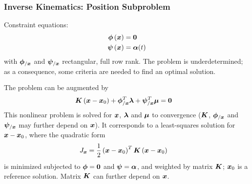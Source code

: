 \subsubsection{Inverse Kinematics: Position Subproblem}
Constraint equations:
\begin{subequations}
\begin{align}
	\bm{\phi}\left( \bm{x} \right)
	&=
	\bm{0}
	\\
	\bm{\psi}\left( \bm{x} \right)
	&=
	\bm{\alpha}(t)
\end{align}
\end{subequations}
with $\bm{\phi}_{/\bm{x}}$ and $\bm{\psi}_{/\bm{x}}$ rectangular, full row rank.
The problem is underdetermined;
as a consequence, some criteria are needed to find an optimal solution.

The problem can be augmented by
\begin{align}
	\bm{K} \left( \bm{x} - \bm{x}_0 \right)
	+
	\bm{\phi}_{/\bm{x}}^T \bm{\lambda}
	+
	\bm{\psi}_{/\bm{x}}^T \bm{\mu}
	&=
	\bm{0}
\end{align}
This nonlinear problem is solved for $\bm{x}$, $\bm{\lambda}$ and $\bm{\mu}$
to convergence ($\bm{K}$, $\bm{\phi}_{/\bm{x}}$ and $\bm{\psi}_{/\bm{x}}$
may further depend on $\bm{x}$).
It corresponds to a least-squares solution for $\bm{x} - \bm{x}_0$,
where the quadratic form
\begin{align}
	J_{\bm{x}}
	&=
	\frac{1}{2} \left( \bm{x} - \bm{x}_0 \right)^T \bm{K} \left( \bm{x} - \bm{x}_0 \right)
\end{align}
is minimized subjected to $\bm{\phi} = \bm{0}$ and $\bm{\psi} = \bm{\alpha}$,
and weighted by matrix $\bm{K}$;
$\bm{x}_0$ is a reference solution.
Matrix $\bm{K}$ can further depend on $\bm{x}$.

